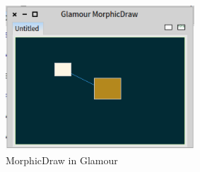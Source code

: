 \documentclass[10pt, twoside]{article}   	%
\begin{document}
\begin{figure}[htb]
\begin{center}
\includegraphics[width=200pt]{GlamourMorphicDraw.png}
\caption{MorphicDraw in Glamour}
\label{glamour}
\end{center}
\end{figure}
\end{document}
